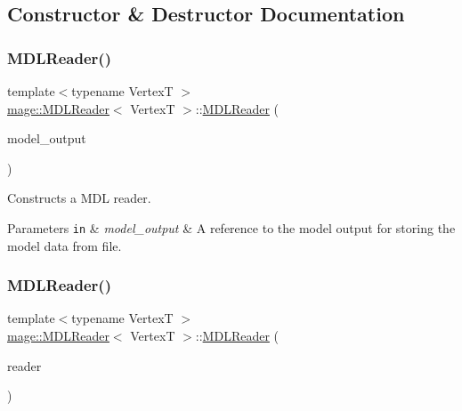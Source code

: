 \subsection{Constructor \& Destructor Documentation}
\hypertarget{classmage_1_1_m_d_l_reader_a068ed8c9101b42033ea166ab7aa03c04}{}\label{classmage_1_1_m_d_l_reader_a068ed8c9101b42033ea166ab7aa03c04} 
\subsubsection{\texorpdfstring{M\+D\+L\+Reader()}{MDLReader()}\hspace{0.1cm}{\footnotesize\ttfamily [1/3]}}
{\footnotesize\ttfamily template$<$typename VertexT $>$ \\
\hyperlink{classmage_1_1_m_d_l_reader}{mage\+::\+M\+D\+L\+Reader}$<$ VertexT $>$\+::\hyperlink{classmage_1_1_m_d_l_reader}{M\+D\+L\+Reader} (\begin{DoxyParamCaption}\item[{\hyperlink{structmage_1_1_model_output}{Model\+Output}$<$ VertexT $>$ \&}]{model\+\_\+output }\end{DoxyParamCaption})\hspace{0.3cm}{\ttfamily [explicit]}}

Constructs a M\+DL reader.


\begin{DoxyParams}[1]{Parameters}
\mbox{\tt in}  & {\em model\+\_\+output} & A reference to the model output for storing the model data from file. \\
\hline
\end{DoxyParams}
\hypertarget{classmage_1_1_m_d_l_reader_ae7b3ee7b2b02101da041249e98f31bcc}{}\label{classmage_1_1_m_d_l_reader_ae7b3ee7b2b02101da041249e98f31bcc} 
\subsubsection{\texorpdfstring{M\+D\+L\+Reader()}{MDLReader()}\hspace{0.1cm}{\footnotesize\ttfamily [2/3]}}
{\footnotesize\ttfamily template$<$typename VertexT $>$ \\
\hyperlink{classmage_1_1_m_d_l_reader}{mage\+::\+M\+D\+L\+Reader}$<$ VertexT $>$\+::\hyperlink{classmage_1_1_m_d_l_reader}{M\+D\+L\+Reader} (\begin{DoxyParamCaption}\item[{const \hyperlink{classmage_1_1_m_d_l_reader}{M\+D\+L\+Reader}$<$ VertexT $>$ \&}]{reader }\end{DoxyParamCaption})\hspace{0.3cm}{\ttfamily [delete]}}

